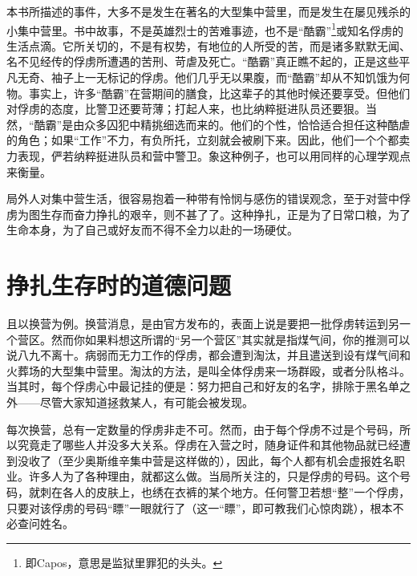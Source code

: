 \documentclass[11pt,oneside]{book}
\begin{document}
\begin{common-format}
本书所描述的事件，大多不是发生在著名的大型集中营里，而是发生在屡见残杀的小集中营里。书中故事，不是英雄烈士的苦难事迹，也不是“酷霸”\footnote{即Capos，意思是监狱里罪犯的头头。}或知名俘虏的生活点滴。它所关切的，不是有权势，有地位的人所受的苦，而是诸多默默无闻、名不见经传的俘虏所遭遇的苦刑、苛虐及死亡。“酷霸”真正瞧不起的，正是这些平凡无奇、袖子上一无标记的俘虏。他们几乎无以果腹，而“酷霸”却从不知饥饿为何物。事实上，许多“酷霸”在营期间的膳食，比这辈子的其他时候还要享受。但他们对俘虏的态度，比警卫还要苛薄；打起人来，也比纳粹挺进队员还要狠。当然，“酷霸”是由众多囚犯中精挑细选而来的。他们的个性，恰恰适合担任这种酷虐的角色；如果“工作”不力，有负所托，立刻就会被刷下来。因此，他们一个个都卖力表现，俨若纳粹挺进队员和营中警卫。象这种例子，也可以用同样的心理学观点来衡量。

局外人对集中营生活，很容易抱着一种带有怜悯与感伤的错误观念，至于对营中俘虏为图生存而奋力挣扎的艰辛，则不甚了了。这种挣扎，正是为了日常口粮，为了生命本身，为了自己或好友而不得不全力以赴的一场硬仗。

\section{挣扎生存时的道德问题}
且以换营为例。换营消息，是由官方发布的，表面上说是要把一批俘虏转运到另一个营区。然而你如果料想这所谓的“另一个营区”其实就是指煤气间，你的推测可以说八九不离十。病弱而无力工作的俘虏，都会遭到淘汰，并且遣送到设有煤气间和火葬场的大型集中营里。淘汰的方法，是叫全体俘虏来一场群殴，或者分队格斗。当其时，每个俘虏心中最记挂的便是：努力把自己和好友的名字，排除于黑名单之外——尽管大家知道拯救某人，有可能会被发现。

每次换营，总有一定数量的俘虏非走不可。然而，由于每个俘虏不过是个号码，所以究竟走了哪些人并没多大关系。俘虏在入营之时，随身证件和其他物品就已经遭到没收了（至少奥斯维辛集中营是这样做的），因此，每个人都有机会虚报姓名职业。许多人为了各种理由，就都这么做。当局所关注的，只是俘虏的号码。这个号码，就刺在各人的皮肤上，也绣在衣裤的某个地方。任何警卫若想“整”一个俘虏，只要对该俘虏的号码“瞟”一眼就行了（这一“瞟”，即可教我们心惊肉跳），根本不必查问姓名。


\end{common-format}
\end{document}
